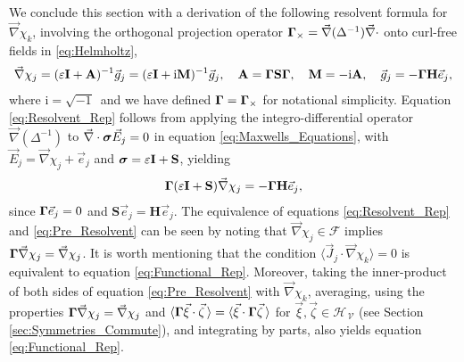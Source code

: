 \documentclass[11pt]{amsart}
\newcommand{\I}{\mathrm{i}}
\newcommand{\Mb}{\mathbf{M}}
\newcommand{\Hb}{\mathbf{H}}
\newcommand{\Ib}{\mathbf{I}}
\newcommand{\Sb}{\mathbf{S}}
\newcommand{\Ab}{\mathbf{A}}
\newcommand{\Vc}{\mathcal{V}}
\newcommand{\Hs}{\mathscr{H}}
\newcommand{\Fs}{\mathscr{F}}
\newcommand\bsig{\mbox{\boldmath${\sigma}$}}
\newcommand\bGamma{\mbox{\boldmath${\Gamma}$}}
\begin{document}
We conclude this section with a derivation of the following resolvent
formula for $\vec{\nabla}\chi_k$, involving the orthogonal projection
operator $\bGamma_\times=\vec{\nabla}(\Delta^{-1})\vec{\nabla}\cdot$ onto curl-free fields in
\eqref{eq:Helmholtz},  
\begin{align}\label{eq:Resolvent_Rep}
  \vec{\nabla}\chi_j=(\varepsilon\Ib+\Ab)^{-1}\vec{g}_j
           =(\varepsilon\Ib+\I\Mb)^{-1}\vec{g}_j, \quad
  \Ab=\bGamma\Sb\bGamma, \quad
  \Mb=-\I\Ab, \quad
  \vec{g}_j=-\bGamma\Hb\vec{e}_j,
\end{align}
%
where $\I=\sqrt{-1}\,$ and we have defined $\bGamma=\bGamma_\times$ for
notational simplicity. Equation \eqref{eq:Resolvent_Rep} follows from
applying the integro-differential operator $\vec{\nabla}(\Delta^{-1})$ to
$\vec{\nabla}\cdot\bsig\vec{E}_j=0$ in equation \eqref{eq:Maxwells_Equations},
with $\vec{E}_j=\vec{\nabla}\chi_j+\vec{e}_j$ and $\bsig=\varepsilon\Ib+\Sb$, yielding  
%
\begin{align}\label{eq:Pre_Resolvent}
  \bGamma(\varepsilon\Ib+\Sb)\vec{\nabla}\chi_j=-\bGamma\Hb\vec{e}_j,
\end{align}
%
since $\bGamma\vec{e}_j=0$ and $\Sb\vec{e}_j=\Hb\vec{e}_j$.
The equivalence of equations \eqref{eq:Resolvent_Rep} and
\eqref{eq:Pre_Resolvent} can be seen by noting that
$\vec{\nabla}\chi_j\in\Fs$ implies $\bGamma\vec{\nabla}\chi_j=\vec{\nabla}\chi_j$. It is worth
mentioning that the 
condition $\langle\vec{J}_j\cdot\vec{\nabla}\chi_k\rangle=0$ is equivalent to equation
\eqref{eq:Functional_Rep}. Moreover, taking the inner-product of both
sides of equation \eqref{eq:Pre_Resolvent} with $\vec{\nabla}\chi_k$,
averaging, using the properties $\bGamma\vec{\nabla}\chi_j=\vec{\nabla}\chi_j$ and
$\langle\bGamma\vec{\xi}\cdot\vec{\zeta}\,\rangle=\langle\vec{\xi}\cdot\bGamma\vec{\zeta}\,\rangle$ for
$\vec{\xi},\vec{\zeta}\in\Hs_{\,\Vc}$ (see Section
\ref{sec:Symmetries_Commute}), and integrating by parts, also yields
equation  \eqref{eq:Functional_Rep}.     
\end{document}

